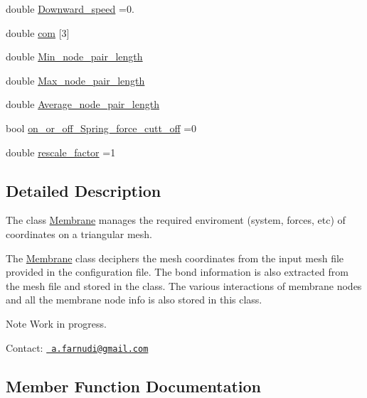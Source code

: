 \begin{DoxyCompactItemize}
$$double \mbox{\hyperlink{classMembrane_a2dae9292b1e7fb768963ada117f98e2c}{Downward\+\_\+speed}} =0.
\item 
double \mbox{\hyperlink{classMembrane_a9908419011350ca5fea46af3f881425c}{com}} \mbox{[}3\mbox{]}
\item 
double \mbox{\hyperlink{classMembrane_a7abb097e17e7293dc1cf559d66a01111}{Min\+\_\+node\+\_\+pair\+\_\+length}}
\item 
double \mbox{\hyperlink{classMembrane_adf55fbfa96375a631b399bd7f6cb1829}{Max\+\_\+node\+\_\+pair\+\_\+length}}
\item 
double \mbox{\hyperlink{classMembrane_ae80a22b9f52cc51918d78269af4a2061}{Average\+\_\+node\+\_\+pair\+\_\+length}}
\item 
bool \mbox{\hyperlink{classMembrane_a9bfff9bd03305c8b5cbac2e3d546727b}{on\+\_\+or\+\_\+off\+\_\+\+Spring\+\_\+force\+\_\+cutt\+\_\+off}} =0
\item 
double \mbox{\hyperlink{classMembrane_a34400db3895f0e440d6f75d52c2a1167}{rescale\+\_\+factor}} =1
\end{DoxyCompactItemize}


\subsection{Detailed Description}
The class \textquotesingle{}\mbox{\hyperlink{classMembrane}{Membrane}}\textquotesingle{} manages the required enviroment (system, forces, etc) of coordinates on a triangular mesh. 

The \mbox{\hyperlink{classMembrane}{Membrane}} class deciphers the mesh coordinates from the input mesh file provided in the configuration file. The bond information is also extracted from the mesh file and stored in the class. The various interactions of membrane nodes and all the membrane node info is also stored in this class.

\begin{DoxyNote}{Note}
Work in progress.
\end{DoxyNote}
Contact\+: \href{mailto:a.farnudi@gmail.com}{\texttt{ a.\+farnudi@gmail.\+com}} 

\subsection{Member Function Documentation}
\mbox{\label{classMembrane_a7524333ddca2039be9931fad57135fad}} 
